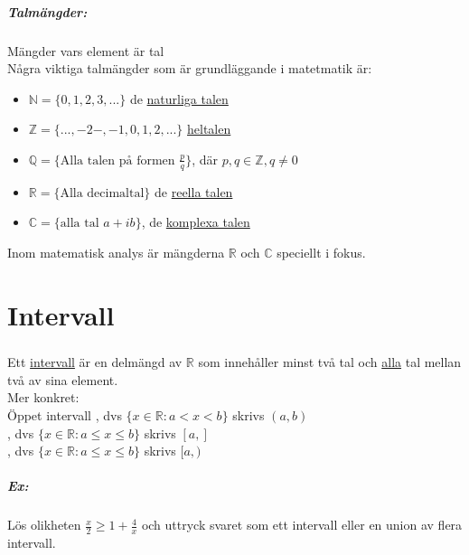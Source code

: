 \paragraph{Talmängder:} Mängder vars element är tal\\

Några viktiga talmängder som är grundläggande i matetmatik är:
\begin{itemize}
    \item $\mathbb{N}=\{0,1,2,3,...\}$ de \underline{naturliga talen}
    \item $\mathbb{Z}=\{...,-2-,-1,0,1,2,...\}$ \underline{heltalen}
    \item $\mathbb{Q}=\{\text{Alla talen på formen }\frac{p}{q}\}$, där $p,q\in\mathbb{Z},q\neq 0$
    \item $\mathbb{R}=\{\text{Alla decimaltal}\}$ de \underline{reella talen}
    \item $\mathbb{C}=\{\text{alla tal }a+ib\}$, de \underline{komplexa talen}
\end{itemize}

Inom matematisk analys är mängderna $\mathbb{R}$ och $\mathbb{C}$ speciellt i fokus.

\chapter{Intervall}
\paragraph{}
Ett \underline{intervall} är en delmängd av $\mathbb{R}$ som innehåller
minst två tal och \underline{alla} tal mellan två av sina element.\\
Mer konkret:\\
Öppet intervall
, dvs $\{x\in\mathbb{R}:a<x<b\}$ skrivs $(a,b)$\\
, dvs $\{x\in\mathbb{R}:a\leq x\leq b\}$ skrivs $[a,]$\\
, dvs $\{x\in\mathbb{R}:a\leq x\leq b\}$ skrivs $[a,)$\\

\paragraph{Ex:}
Lös olikheten $\frac{x}{2}\geq 1+ \frac{4}{x}$ och uttryck svaret som ett intervall eller en union av flera intervall.
